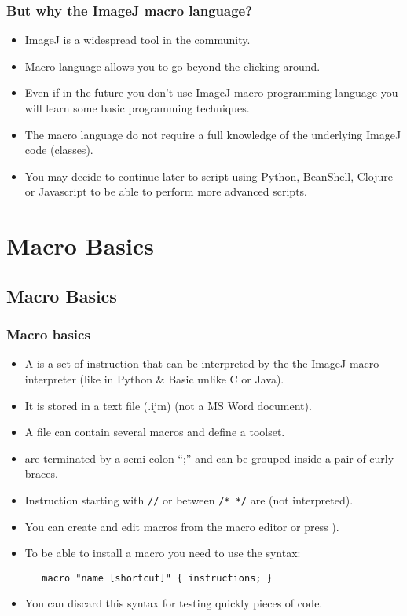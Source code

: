 \begin{frame}
  \frametitle{But why the ImageJ macro language?}
  \begin{itemize}
  \item ImageJ is a widespread tool in the community.
  \item Macro language allows you to go beyond the clicking around.
  \item Even if in the future you don't use ImageJ macro programming
    language you will learn some basic programming techniques.
  \item The macro language do not require a full knowledge of the
    underlying ImageJ code (classes).
  \item You may decide to continue later to script using Python,
    BeanShell, Clojure or Javascript to be able to perform more
    advanced scripts.
  \end{itemize}
\end{frame}

\section{Macro Basics}
\subsection{Macro Basics}
\begin{frame}[fragile]
  \frametitle<presentation>{Macro basics}
  \begin{itemize}
  \item A  is a set of instruction that can be interpreted
    by the the ImageJ macro interpreter (like in Python \& Basic unlike
    C or Java).
  \item It is stored in a text file (.ijm) (not a MS Word document).
  \item A file can contain several macros and define a toolset.
  \item {} are terminated by a semi colon ``;'' and can
    be grouped inside a pair of curly braces.
  \item Instruction starting with \verb$//$ or between \verb$/* */$
    are  (not interpreted).
  \item You can create and edit macros from the macro editor
     or press \keys{\{}).
  \item To be able to install a macro you need to use the syntax:
    \begin{minipage}{5cm}
      \verb$   macro "name [shortcut]" { instructions; } $
    \end{minipage}
  \item You can discard this syntax for testing quickly pieces of code.
\end{itemize}
\end{frame}

